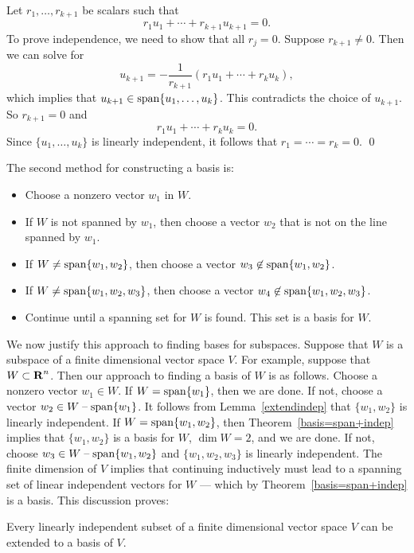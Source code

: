 \proof  Let $r_1,\ldots,r_{k+1}$ be scalars such that
\begin{equation}  \label{rk+1}
r_1u_1 + \cdots + r_{k+1}u_{k+1} = 0.
\end{equation}
To prove independence, we need to show that all $r_j=0$.
Suppose $r_{k+1}\neq 0$.  Then we can solve  for
\[
u_{k+1} = -\frac{1}{r_{k+1}}(r_1u_1+\cdots +r_ku_k),
\]
which implies that $u_{k+1}\in {\rm span}\{u_1,\ldots,u_k\}$.  This
contradicts the choice of $u_{k+1}$.  So $r_{k+1}=0$ and
\[
r_1u_1 + \cdots + r_ku_k = 0.
\]
Since $\{u_1,\ldots,u_k\}$ is linearly independent, it follows
that $r_1=\cdots =r_k=0$.  \qed

The second method for constructing a basis is:
\begin{itemize}
\item        Choose a nonzero vector $w_1$ in $W$.
\item If $W$ is not spanned by $w_1$, then choose a vector $w_2$
that is not on the line spanned by $w_1$.
\item        If $W\neq{\rm span}\{w_1,w_2\}$, then choose a vector
$w_3\not\in
{\rm span}\{w_1,w_2\}$.
\item        If $W\neq{\rm span}\{w_1,w_2,w_3\}$, then choose a vector
$w_4\not\in
{\rm span}\{w_1,w_2,w_3\}$.
\item Continue until a spanning set for $W$ is
found.  This set is a basis for $W$.
\end{itemize}

We now justify this approach to finding bases for subspaces.
Suppose that $W$ is a subspace of a finite dimensional vector
space $V$.  For example, suppose that $W\subset\mbox{$\bf{R}$}^n$. Then
our approach to finding a basis of $W$ is as follows.  Choose a
nonzero vector $w_1\in W$.  If $W={\rm span}\{w_1\}$, then we are
done.  If not, choose a vector $w_2\in W\;\mbox{--}\;{\rm span}\{w_1\}$.
It follows from Lemma~\ref{extendindep} that $\{w_1,w_2\}$ is
linearly independent.  If $W={\rm span}\{w_1,w_2\}$, then
Theorem~\ref{basis=span+indep} implies that $\{w_1,w_2\}$ is
a basis for $W$, $\dim W=2$, and we are done.  If not, choose
$w_3\in W\;\mbox{--}\;{\rm span}\{w_1,w_2\}$ and $\{w_1,w_2,w_3\}$ is
linearly independent.  The finite dimension of $V$ implies that
continuing inductively must lead to a spanning set of linear
independent vectors for $W$ --- which by
Theorem~\ref{basis=span+indep} is a basis. This discussion proves:
\begin{cor}  \label{c:extendindependent}
Every linearly independent subset of a finite dimensional vector
space $V$ can be extended to a basis of $V$.
\end{cor}


